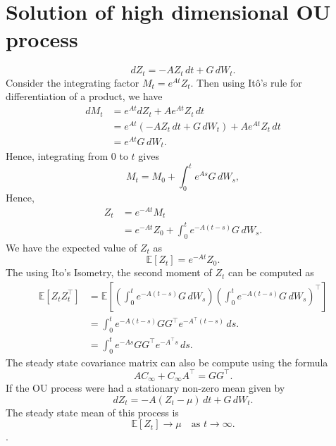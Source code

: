 \documentclass[11pt]{article}
\begin{document}
\section{Solution of high dimensional OU process}
\label{a:sec-vec-ou-solution}
\begin{equation}
    dZ_t = -AZ_t\,dt + G\,dW_t.
\end{equation}
Consider the integrating factor $M_t = e^{At}Z_t$. Then using It\^o's rule for differentiation of a product, we have
\begin{align}
    dM_t & = e^{At}dZ_t + A e^{At}Z_t\,dt                  \\
         & = e^{At}(-AZ_t\,dt + G\,dW_t) + A e^{At}Z_t\,dt \\
         & = e^{At}G\,dW_t.
\end{align}
Hence, integrating from $0$ to $t$ gives
\begin{equation}
    M_t = M_0 + \int_0^t e^{As}G
    \,dW_s,
\end{equation}
Hence,
\begin{align}
    Z_t & = e^{-At}M_t                         \\
        & = e^{-At}Z_0 + \int_0^t e^{-A(t-s)}G
    \,dW_s.
\end{align}
We have the expected value of $Z_t$ as
\begin{equation}
    \mathbb{E}[Z_t] = e^{-At}Z_0.
\end{equation}
The using Ito's Isometry, the second moment of $Z_t$ can be computed as
\begin{align}
    \mathbb{E}[Z_tZ_t^\top]
     & = \mathbb{E}\left[\left(\int_0^t e^{-A(t-s)}G\,dW_s\right)
        \left(\int_0^t e^{-A(t-s)}G\,dW
    _s\right)^\top\right]                                         \\
     & = \int_0^t e^{-A(t-s)}GG^\top e^{-A^\top(t-s)}\,ds.        \\
     & = \int_0^t e^{-As}GG^\top e^{-A^\top s}\,ds.
\end{align}
The steady state covariance matrix can also be compute using the formula
\begin{equation}
    AC_\infty + C_\infty A^\top = GG^\top.
\end{equation}
If the OU process were had a stationary non-zero mean given by
\begin{equation}
    dZ_t = -A(Z_t - \mu)\,dt + G\,dW_t.
\end{equation}
The steady state mean of this process is
\begin{equation}
    \mathbb{E}[Z_t] \to \mu \quad \text{as } t \to \infty.
\end{equation}.
\end{document}

